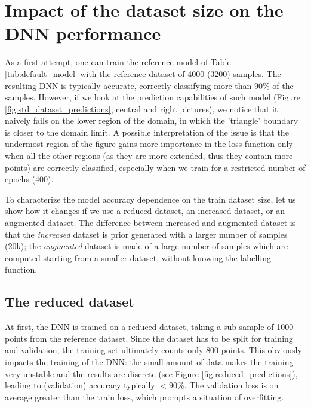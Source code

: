 \section{Impact of the dataset size on the DNN performance}
\label{sec:dataset_variations}

As a first attempt, one can train the reference model of Table \ref{tab:default_model} with the reference dataset of 4000 (3200) samples. The resulting DNN is typically accurate, correctly classifying more than $90\%$ of the samples. However, if we look at the prediction capabilities of such model (Figure \ref{fig:std_dataset_predictions}, central and right pictures), we notice that it naively fails on the lower region of the domain, in which the 'triangle' boundary is closer to the domain limit. A possible interpretation of the issue is that the undermost region of the figure gains more importance in the loss function only when all the other regions (as they are more extended, thus they contain more points) are correctly classified, especially when we train for a restricted number of epochs (400).




To characterize the model accuracy dependence on the train dataset size, let us show how it changes if we use a reduced dataset, an increased dataset, or an augmented dataset. The difference between increased and augmented dataset is that the \emph{increased} dataset is prior generated with a larger number of samples (20k); the \emph{augmented} dataset is made of a large number of samples which are computed starting from a smaller dataset, without knowing the labelling function.


\subsection{The reduced dataset}
\label{ssec:reduced_dataset}

At first, the DNN is trained on a reduced dataset, taking a sub-sample of 1000 points from the reference dataset. Since the dataset has to be split for training and validation, the training set ultimately counts only $800$ points. This obviously impacts the training of the DNN: the small amount of data makes the training very unstable and the results are discrete (see Figure \ref{fig:reduced_predictions}), leading to (validation) accuracy typically $<90\%$. The validation loss is on average greater than the train loss, which prompts a situation of overfitting.

